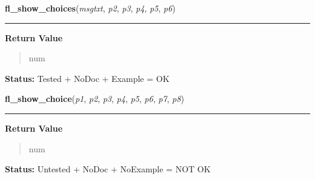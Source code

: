 \hspace{.8\funcindent}\begin{boxedminipage}{\funcwidth}

    \raggedright \textbf{fl\_show\_choices}(\textit{msgtxt}, \textit{p2}, \textit{p3}, \textit{p4}, \textit{p5}, \textit{p6})

    \vspace{-1.5ex}

    \rule{\textwidth}{0.5\fboxrule}
\setlength{\parskip}{2ex}
\setlength{\parskip}{1ex}
      \textbf{Return Value}
    \vspace{-1ex}

      \begin{quote}
      num

      \end{quote}

\textbf{Status:} Tested + NoDoc + Example = OK



    \end{boxedminipage}

    \label{xformslib:library:fl_show_choice}

    \vspace{0.5ex}

\hspace{.8\funcindent}\begin{boxedminipage}{\funcwidth}

    \raggedright \textbf{fl\_show\_choice}(\textit{p1}, \textit{p2}, \textit{p3}, \textit{p4}, \textit{p5}, \textit{p6}, \textit{p7}, \textit{p8})

    \vspace{-1.5ex}

    \rule{\textwidth}{0.5\fboxrule}
\setlength{\parskip}{2ex}
\setlength{\parskip}{1ex}
      \textbf{Return Value}
    \vspace{-1ex}

      \begin{quote}
      num

      \end{quote}

\textbf{Status:} Untested + NoDoc + NoExample = NOT OK



    \end{boxedminipage}

    \label{xformslib:library:fl_hide_choice}


